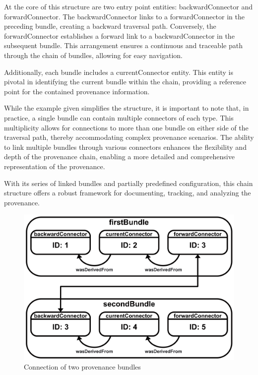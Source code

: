 \documentclass[
  digital,     %
  oneside,     %
  nosansbold,  %
  nocolorbold, %
  lof,         %
  lot,         %
]{fithesis4}
\begin{document}
At the core of this structure are two entry point entities: backwardConnector and forwardConnector. The backwardConnector links to a forwardConnector in the preceding bundle, creating a backward traversal path. Conversely, the forwardConnector establishes a forward link to a backwardConnector in the subsequent bundle. This arrangement ensures a continuous and traceable path through the chain of bundles, allowing for easy navigation.

Additionally, each bundle includes a currentConnector entity. This entity is pivotal in identifying the current bundle within the chain, providing a reference point for the contained provenance information.

While the example given simplifies the structure, it is important to note that, in practice, a single bundle can contain multiple connectors of each type. This multiplicity allows for connections to more than one bundle on either side of the traversal path, thereby accommodating complex provenance scenarios. The ability to link multiple bundles through various connectors enhances the flexibility and depth of the provenance chain, enabling a more detailed and comprehensive representation of the provenance.

With its series of linked bundles and partially predefined configuration, this chain structure offers a robust framework for documenting, tracking, and analyzing the provenance.

\begin{figure}[htbp]
  \begin{center}
    \includegraphics[width=12.5cm]{fithesis/images/bundleconnection.png}
  \end{center}
  \caption{Connection of two provenance bundles}
  \label{fig:bundleconnection}
\end{figure}
\shorthandon{-}
\end{document}
